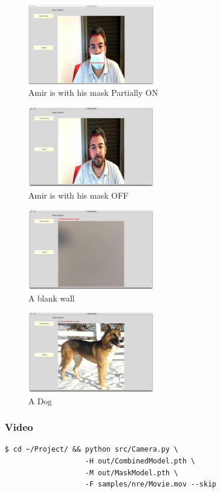 \begin{figure}[H]
    \centering
    \includegraphics[width=0.5\textwidth]{images/Demo/Partial.png}
    \caption{Amir is with his mask Partially ON}
    \label{fig:PartialMaskedAmir}
\end{figure}
\begin{figure}[H]
    \centering
    \includegraphics[width=0.5\textwidth]{images/Demo/Unmasked.png}
    \caption{Amir is with his mask OFF}
    \label{fig:UnMaskedAmir}
\end{figure}
\begin{figure}[H]
    \centering
    \includegraphics[width=0.5\textwidth]{images/Demo/wall.png}
    \caption{A blank wall}
    \label{fig:Wall}
\end{figure}
\begin{figure}[H]
    \centering
    \includegraphics[width=0.5\textwidth]{images/Demo/dog.png}
    \caption{A Dog}
    \label{fig:Dog}
\end{figure}
\subsubsection{Video}
\begin{verbatim}
$ cd ~/Project/ && python src/Camera.py \
                   -H out/CombinedModel.pth \
                   -M out/MaskModel.pth \
                   -F samples/nre/Movie.mov --skip
\end{verbatim}
